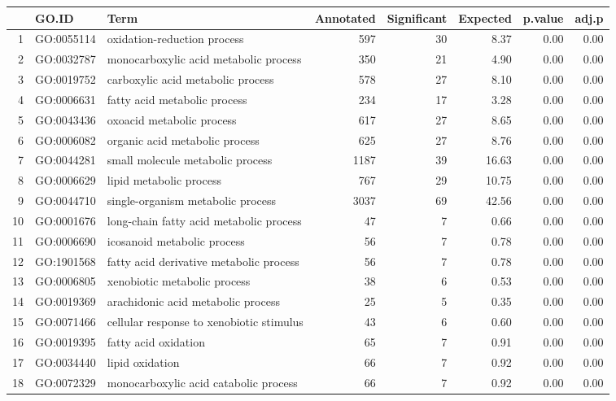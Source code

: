 \begin{table}[ht]
\centering
\begin{tabular}{rllrrrrr}
  \hline
 & GO.ID & Term & Annotated & Significant & Expected & p.value & adj.p \\ 
  \hline
1 & GO:0055114 & oxidation-reduction process & 597 &  30 & 8.37 & 0.00 & 0.00 \\ 
  2 & GO:0032787 & monocarboxylic acid metabolic process & 350 &  21 & 4.90 & 0.00 & 0.00 \\ 
  3 & GO:0019752 & carboxylic acid metabolic process & 578 &  27 & 8.10 & 0.00 & 0.00 \\ 
  4 & GO:0006631 & fatty acid metabolic process & 234 &  17 & 3.28 & 0.00 & 0.00 \\ 
  5 & GO:0043436 & oxoacid metabolic process & 617 &  27 & 8.65 & 0.00 & 0.00 \\ 
  6 & GO:0006082 & organic acid metabolic process & 625 &  27 & 8.76 & 0.00 & 0.00 \\ 
  7 & GO:0044281 & small molecule metabolic process & 1187 &  39 & 16.63 & 0.00 & 0.00 \\ 
  8 & GO:0006629 & lipid metabolic process & 767 &  29 & 10.75 & 0.00 & 0.00 \\ 
  9 & GO:0044710 & single-organism metabolic process & 3037 &  69 & 42.56 & 0.00 & 0.00 \\ 
  10 & GO:0001676 & long-chain fatty acid metabolic process &  47 &   7 & 0.66 & 0.00 & 0.00 \\ 
  11 & GO:0006690 & icosanoid metabolic process &  56 &   7 & 0.78 & 0.00 & 0.00 \\ 
  12 & GO:1901568 & fatty acid derivative metabolic process &  56 &   7 & 0.78 & 0.00 & 0.00 \\ 
  13 & GO:0006805 & xenobiotic metabolic process &  38 &   6 & 0.53 & 0.00 & 0.00 \\ 
  14 & GO:0019369 & arachidonic acid metabolic process &  25 &   5 & 0.35 & 0.00 & 0.00 \\ 
  15 & GO:0071466 & cellular response to xenobiotic stimulus &  43 &   6 & 0.60 & 0.00 & 0.00 \\ 
  16 & GO:0019395 & fatty acid oxidation &  65 &   7 & 0.91 & 0.00 & 0.00 \\ 
  17 & GO:0034440 & lipid oxidation &  66 &   7 & 0.92 & 0.00 & 0.00 \\ 
  18 & GO:0072329 & monocarboxylic acid catabolic process &  66 &   7 & 0.92 & 0.00 & 0.00 \\ 

\end{tabular}
\end{table}
